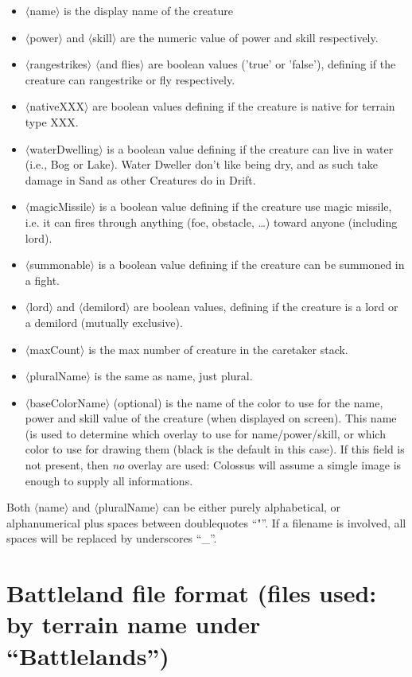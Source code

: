 \documentclass{article}
\begin{document}
\begin{itemize}
\item $\langle$name$\rangle$ is the display name of the creature
\item $\langle$power$\rangle$ and $\langle$skill$\rangle$ are the numeric value of power and skill respectively.
\item $\langle$rangestrikes$\rangle$ $\langle$and flies$\rangle$ are boolean values ('true' or 'false'), defining if the creature can rangestrike or fly respectively.
\item $\langle$nativeXXX$\rangle$ are boolean values defining if the creature is native for terrain type XXX.
\item $\langle$waterDwelling$\rangle$ is a boolean value defining if the creature can live in water (i.e., Bog or Lake). Water Dweller don't like being dry, and as such take damage in Sand as other Creatures do in Drift.
\item $\langle$magicMissile$\rangle$ is a boolean value defining if the creature use magic missile, i.e. it can fires through anything (foe, obstacle, \ldots) toward anyone (including lord).
\item $\langle$summonable$\rangle$ is a boolean value defining if the creature can be summoned in a fight.
\item $\langle$lord$\rangle$ and $\langle$demilord$\rangle$ are boolean values, defining if the creature is a lord or a demilord (mutually exclusive).
\item $\langle$maxCount$\rangle$ is the max number of creature in the caretaker stack.
\item $\langle$pluralName$\rangle$ is the same as name, just plural.
\item $\langle$baseColorName$\rangle$ (optional) is the name of the color to use for the name, power and skill value of the creature (when displayed on screen). This name (is used to determine which overlay to use for name/power/skill, or which color to use for drawing them (black is the default in this case). If this field is not present, then \emph{no} overlay are used: Colossus will assume a simgle image is enough to supply all informations.
\end{itemize}

Both $\langle$name$\rangle$ and $\langle$pluralName$\rangle$ can be either purely alphabetical, or alphanumerical plus spaces between doublequotes ``"''. If a filename is involved, all spaces will be replaced by underscores ``\_''.

\section{Battleland file format (files used: by terrain name under ``Battlelands'')}
\label{BATTLELANDS}
\end{document}
